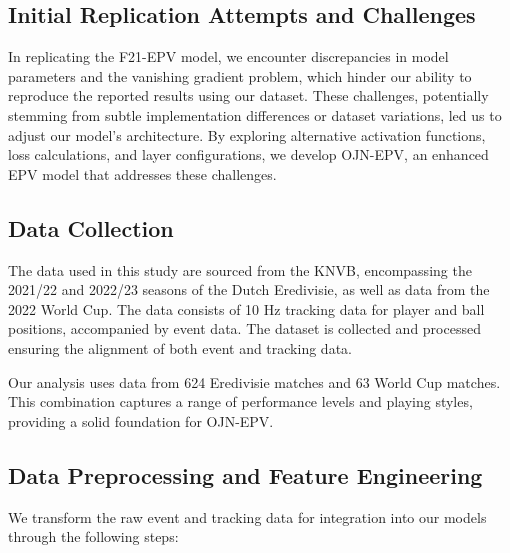\subsection{Initial Replication Attempts and Challenges}

In replicating the F21-EPV model, we encounter discrepancies in model parameters and the vanishing gradient problem, which hinder our ability to reproduce the reported results using our dataset. These challenges, potentially stemming from subtle implementation differences or dataset variations, led us to adjust our model's architecture. By exploring alternative activation functions, loss calculations, and layer configurations, we develop OJN-EPV, an enhanced EPV model that addresses these challenges.

\subsection{Data Collection}

The data used in this study are sourced from the KNVB, encompassing the 2021/22 and 2022/23 seasons of the Dutch Eredivisie, as well as data from the 2022 World Cup. The data consists of 10 Hz tracking data for player and ball positions, accompanied by event data. The dataset is collected and processed ensuring the alignment of both event and tracking data.

Our analysis uses data from 624 Eredivisie matches and 63 World Cup matches. This combination captures a range of performance levels and playing styles, providing a solid foundation for OJN-EPV.

\subsection{Data Preprocessing and Feature Engineering}

We transform the raw event and tracking data for integration into our models through the following steps:

